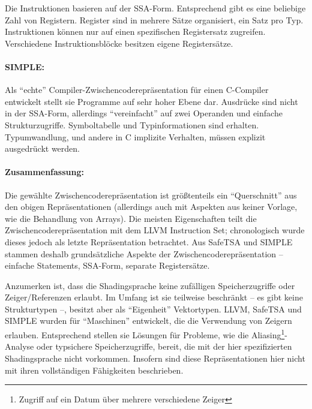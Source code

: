 \documentclass[twoside,a4paper,fleqn,12pt]{book}
\begin{document}
Die Instruktionen basieren auf der SSA-Form. Entsprechend gibt es eine beliebige Zahl von Registern.
Register sind in mehrere Sätze organisiert, ein Satz pro Typ. Instruktionen können nur auf einen
spezifischen Registersatz zugreifen. Verschiedene Instruktionsblöcke besitzen eigene Registersätze.


\paragraph{SIMPLE:} Als "`echte"' Compiler-Zwischencoderepräsentation für einen C-Compiler entwickelt
stellt sie Programme auf sehr hoher Ebene dar. Ausdrücke sind nicht in der SSA-Form, allerdings
"`vereinfacht"' auf zwei Operanden und einfache Strukturzugriffe. Symboltabelle und Typinformationen
sind erhalten. Typumwandlung, und andere in C implizite Verhalten, müssen explizit ausgedrückt werden.


\paragraph{Zusammenfassung:}
Die gewählte Zwischencoderepräsentation ist größtenteils ein "`Querschnitt"' aus den obigen Repräsentationen
(allerdings auch mit Aspekten aus keiner Vorlage, wie die Behandlung von Arrays). Die meisten Eigenschaften
teilt die Zwischencoderepräsentation mit dem LLVM Instruction Set; chronologisch wurde dieses jedoch als letzte
Repräsentation betrachtet. Aus SafeTSA und SIMPLE stammen deshalb grundsätzliche Aspekte der Zwischencoderepräsentation 
-- einfache Statements, SSA-Form, separate Registersätze.

Anzumerken ist, dass die Shadingsprache keine zufälligen Speicherzugriffe oder Zeiger/Referenzen erlaubt.
Im Umfang ist sie teilweise beschränkt -- es gibt keine Strukturtypen --, besitzt aber als "`Eigenheit"' Vektortypen.
LLVM, SafeTSA und SIMPLE wurden für "`Maschinen"' entwickelt, die die Verwendung von Zeigern erlauben. Entsprechend
stellen sie Lösungen für Probleme, wie die Aliasing\footnote{Zugriff auf ein Datum über mehrere verschiedene Zeiger}-Analyse oder typsichere Speicherzugriffe, bereit, die mit
der hier spezifizierten Shadingsprache nicht vorkommen. Insofern sind diese Repräsentationen hier nicht
mit ihren vollständigen Fähigkeiten beschrieben.
\end{document}
